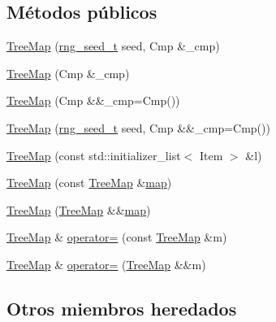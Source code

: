\subsection*{Métodos públicos}
\begin{DoxyCompactItemize}
\item 
\hyperlink{class_designar_1_1_tree_map_a8f36580c132ec2cf3c1d4cd4ab8a4fa5}{Tree\+Map} (\hyperlink{namespace_designar_ad621b5646d45288c5d6a1e1dfe7531a8}{rng\+\_\+seed\+\_\+t} seed, Cmp \&\+\_\+cmp)
\item 
\hyperlink{class_designar_1_1_tree_map_ac0bcb95d2b1a18bd59c98ad89c3dc7a4}{Tree\+Map} (Cmp \&\+\_\+cmp)
\item 
\hyperlink{class_designar_1_1_tree_map_a10fa15275739543d0a7bc6470c0639dc}{Tree\+Map} (Cmp \&\&\+\_\+cmp=Cmp())
\item 
\hyperlink{class_designar_1_1_tree_map_a59cf2c9babbf20a9db85f133aa15dfd5}{Tree\+Map} (\hyperlink{namespace_designar_ad621b5646d45288c5d6a1e1dfe7531a8}{rng\+\_\+seed\+\_\+t} seed, Cmp \&\&\+\_\+cmp=Cmp())
\item 
\hyperlink{class_designar_1_1_tree_map_add7b0ee1ebafb7894771c14029e2aeca}{Tree\+Map} (const std\+::initializer\+\_\+list$<$ Item $>$ \&l)
\item 
\hyperlink{class_designar_1_1_tree_map_a5b71308661829869487a7c904a37fb09}{Tree\+Map} (const \hyperlink{class_designar_1_1_tree_map}{Tree\+Map} \&\hyperlink{class_designar_1_1_container_algorithms_a3b9044a197e4ceec6a1de03de197a293}{map})
\item 
\hyperlink{class_designar_1_1_tree_map_a8c281295a0099d65d21f56f5787a8dd9}{Tree\+Map} (\hyperlink{class_designar_1_1_tree_map}{Tree\+Map} \&\&\hyperlink{class_designar_1_1_container_algorithms_a3b9044a197e4ceec6a1de03de197a293}{map})
\item 
\hyperlink{class_designar_1_1_tree_map}{Tree\+Map} \& \hyperlink{class_designar_1_1_tree_map_a62214ac5be4a1d8d71e51e9b1a62d27a}{operator=} (const \hyperlink{class_designar_1_1_tree_map}{Tree\+Map} \&m)
\item 
\hyperlink{class_designar_1_1_tree_map}{Tree\+Map} \& \hyperlink{class_designar_1_1_tree_map_a0cf9ac62d56f4c4105d50aa8b730fd34}{operator=} (\hyperlink{class_designar_1_1_tree_map}{Tree\+Map} \&\&m)
\end{DoxyCompactItemize}
\subsection*{Otros miembros heredados}


